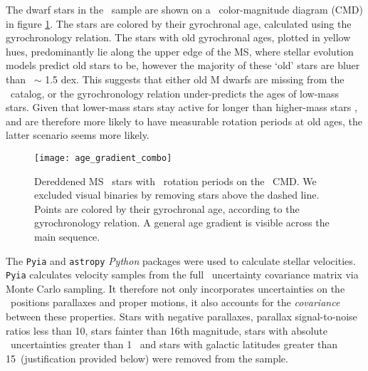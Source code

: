 The dwarf stars in the \mct\ sample are shown on a \gaia\ color-magnitude
diagram (CMD) in figure \ref{fig:age_gradient}.
The stars are colored by their gyrochronal age, calculated using the
\citep{angus2019} gyrochronology relation.
The stars with old gyrochronal ages, plotted in yellow hues, predominantly lie
along the upper edge of the MS, where stellar evolution models predict old
stars to be, however the majority of these `old' stars are bluer than \gcolor\
$\sim$ 1.5 dex.
This suggests that either old M dwarfs are missing from the \mct\ catalog, or
the \citet{angus2019} gyrochronology relation under-predicts the ages of
low-mass stars.
Given that lower-mass stars stay active for longer than higher-mass stars
\citep[\eg][]{west2011}, and are therefore more likely to have measurable
rotation periods at old ages, the latter scenario seems more likely.
\begin{figure}
  \caption{
Dereddened MS \kepler\ stars with \mct\ rotation periods on the \gaia\ CMD.
We excluded visual binaries by removing stars above the dashed line.
    Points are colored by their gyrochronal
    age, according to the
    \citet{angus2019} gyrochronology relation.
    A general age gradient is visible across the main sequence.
}
  \centering
    \texttt{[image: age\_gradient\_combo]}
\label{fig:age_gradient}
\end{figure}

The {\tt Pyia} \citep{price-whelan_2018} and {\tt astropy} \citep{astropy2013,
astropy2018} {\it Python} packages were used to calculate stellar velocities.
{\tt Pyia} calculates velocity samples from the full \gaia\ uncertainty
covariance matrix via Monte Carlo sampling.
It therefore not only incorporates uncertainties on the \gaia\ positions
parallaxes and proper motions, it also accounts for the {\it covariance}
between these properties.
Stars with negative parallaxes, parallax signal-to-noise ratios less than 10,
stars fainter than 16th magnitude, stars with absolute \vb\ uncertainties
greater than 1 \kms\, and stars with galactic latitudes greater than
15\degrees\ (justification provided below) were removed from the sample.

